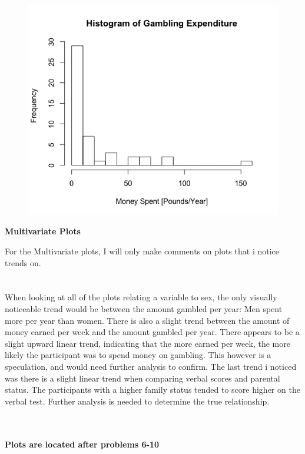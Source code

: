 \documentclass{exam}
\begin{document}
	\begin{figure}[h]
		\includegraphics[scale=.5]{gamble}
		\centering
		
	\end{figure}
	
	\noindent
	\textbf{Multivariate Plots}
	
	\noindent
	For the Multivariate plots, I will only make comments on plots that i notice trends on.
	\\
	\\
	\\ 
	When looking at all of the plots relating a variable to sex, the only visually noticeable trend would be between the amount gambled per year: Men spent more per year than women. There is also a slight trend between the amount of money earned per week and the amount gambled per year. There appears to be a slight upward linear trend, indicating that the more earned per week, the more likely the participant was to spend money on gambling. This however is a speculation, and would need further analysis to confirm. 
	The last trend i noticed was there is a slight linear trend when comparing verbal scores and parental status. The participants with a higher family status tended to score higher on the verbal test. Further analysis is needed to determine the true relationship.  
 
\\
\\
\textbf{Plots are located after problems 6-10 } 
\end{document}
